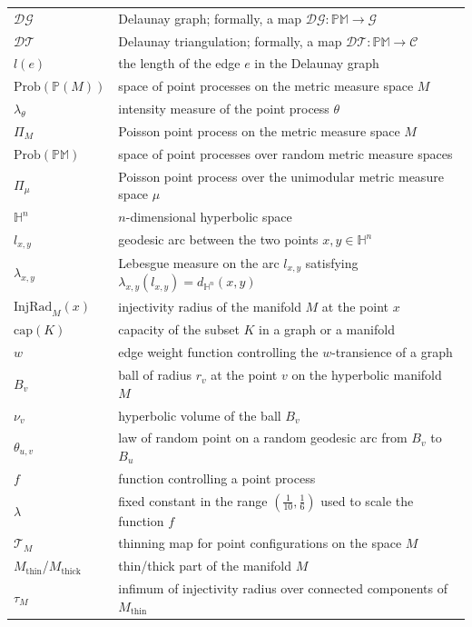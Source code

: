 \documentclass{amsart}
\newcommand{\HH}{\mathbb{H}}
\newcommand{\MP}{\mathbb{PM}}
\newcommand{\Points}{\mathbb{P}}
\newcommand{\Graphs}{\mathcal{G}}
\newcommand{\Complexes}{\mathcal{C}}
\newcommand{\DelanGraph}{\mathcal{DG}}
\newcommand{\DelanComplex}{\mathcal{DT}}
\newcommand{\Prob}[1]{\mathrm{Prob}\left(#1\right)}
\theoremstyle{plain}
\numberwithin{equation}{section}
\theoremstyle{definition}
\begin{document}
\begin{center}
\begin{longtable}{ll}
$\DelanGraph$ & Delaunay graph; formally, a map $\DelanGraph : \MP \to \Graphs$ \\
$\DelanComplex$ & Delaunay triangulation; formally, a map $\DelanComplex : \MP \to \Complexes$ \\
$l(e)$ & the length of the edge $e$ in the Delaunay graph\\
\hline
$\Prob{\Points(M)}$ & space of point processes on the metric measure space $M$\\
$\lambda_\theta$ &  intensity measure of the point process $\theta$\\
$\Pi_M$ & Poisson point process on the metric measure space $M$\\
\hline
$\mathrm{Prob}(\MP)$ & space of point processes over random metric measure spaces \\
$\Pi_\mu$ & Poisson point process over the unimodular metric measure space $\mu$\\
\hline
$\HH^n$ & $n$-dimensional hyperbolic space\\
$l_{x,y}$ & geodesic arc between the two points $x,y \in \HH^n$ \\
$\lambda_{x,y}$ & Lebesgue measure on the arc $l_{x,y}$ satisfying $\lambda_{x,y}(l_{x,y}) = d_{\HH^n}(x,y)$ \\
$\mathrm{InjRad}_M(x)$ & injectivity radius of the manifold $M$ at the point $x$\\
$\mathrm{cap}(K)$ & capacity of the subset $K$ in a graph or a manifold\\
$w$ & edge weight function controlling the $w$-transience of a graph\\
\hline
$B_v$ & ball of radius $r_v$ at the point $v$ on the hyperbolic  manifold $M$\\
$\nu_v$ & hyperbolic volume of the ball $B_v$\\
$\theta_{u,v}$ & law of random point on a random geodesic arc from $B_v$ to $B_u$\\
\hline
$f$ & function controlling a point process \\
$\lambda$ & fixed constant in the range $(\frac{1}{10},\frac{1}{6})$ used to scale the function $f$\\
$\mathcal{T}_M$ & thinning map for point configurations on the space $M$\\
\hline
$M_\textrm{thin}$/$M_\textrm{thick}$ & thin/thick part of the manifold $M$ \\
$\tau_M$ & infimum of injectivity radius over connected components of $M_\textrm{thin}$\\

\end{longtable}
\end{center}
\end{document}
